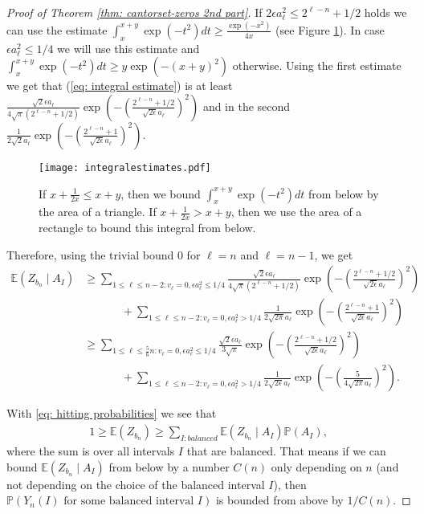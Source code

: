 \documentclass[11pt,reqno]{amsart}
\theoremstyle{plain}
\theoremstyle{definition}
\theoremstyle{remark}
\begin{document}
\begin{proof}[Proof of Theorem \ref{thm: cantorset-zeros 2nd part}]
If $2\epsilon a^2_\ell \leq 2^{\ell - n} + 1/2$ holds we can use the estimate $\int_x^{x+y} \exp(-t^2)dt \geq \frac{\exp{(-x^2)}}{4x}$ (see Figure \ref{fig: integral estimates}).
In case $\epsilon a^2_\ell \leq 1/4$ we will use this estimate and $\int_x^{x+y} \exp(-t^2)dt \geq y \exp (-(x+y)^2)$ otherwise. Using the first estimate we get that (\ref{eq: integral estimate}) is at least $\frac{\sqrt{2}\epsilon a_\ell}{4\sqrt{\pi}(2^{\ell - n}+1/2)}\exp(- (\frac{2^{\ell - n}+1/2}{\sqrt{2\epsilon}a_\ell})^2)$ and in the second $\frac{1}{2\sqrt{2}a_\ell}\exp(- (\frac{2^{\ell - n}+1}{\sqrt{2\epsilon}a_\ell})^2)$.

\begin{figure}

\texttt{[image: integralestimates.pdf]}

\caption{If $x+\frac{1}{2x} \leq x+y$, then we bound $\int_x^{x+y} \exp(-t^2)dt$ from below by the area of a triangle. If $x+\frac{1}{2x} > x+y$, then we use the area of a rectangle to bound this integral from below.}

\label{fig: integral estimates}

\end{figure}
Therefore, using the trivial bound $0$ for $\ell=n$ and $\ell=n-1$, we get
\begin{align}\label{eq: balanced first moment}
\mathbb{E} (Z_{b_n} \mid A_I) &\geq \sum_{1 \leq \ell \leq n-2: v_\ell=0, \epsilon a^2_\ell \leq 1/4} \frac{\sqrt{2}\epsilon a_\ell}{4\sqrt{\pi}(2^{\ell - n}+1/2)}\exp(- (\frac{2^{\ell - n}+1/2}{\sqrt{2\epsilon}a_\ell})^2) \\ \nonumber
& \ \ \ \ \  \ \ \ \ \  \ \ \ \ \ + \sum_{1 \leq \ell \leq n-2: v_\ell=0, \epsilon a^2_\ell > 1/4} \frac{1}{2\sqrt{2\pi}a_\ell}\exp(- (\frac{2^{\ell - n}+1}{\sqrt{2\epsilon}a_\ell})^2)
\\&\geq \sum_{1 \leq \ell \leq \frac{5}{6}n: v_\ell=0, \epsilon a^2_\ell \leq 1/4} \frac{\sqrt{2}\epsilon a_\ell}{3\sqrt{\pi}}\exp(- (\frac{2^{\ell - n}+1/2}{\sqrt{2\epsilon}a_\ell})^2) \nonumber
\\& \ \ \ \ \  \ \ \ \ \  \ \ \ \ \ + \sum_{1 \leq \ell \leq n-2: v_\ell=0, \epsilon a^2_\ell > 1/4} \frac{1}{2\sqrt{2\epsilon}a_\ell}\exp(- (\frac{5}{4\sqrt{2\pi}a_\ell})^2). \nonumber
\end{align}

With \eqref{eq: hitting probabilities} we see that
\begin{align}\label{eq: balanced first moment inequal}
1 \geq {\mathbb{E}} (Z_{b_n}) \geq\sum_{I: balanced} \mathbb{E} (Z_{b_n} \mid A_I) {\mathbb{P}}(A_I),
\end{align}
where the sum is over all intervals $I$ that are balanced.
That means if we can bound $\mathbb{E} (Z_{b_n} \mid A_I)$ from below by a number $C(n)$ only depending on $n$ (and not depending on the choice of the balanced interval $I$), then $\mathbb{P}(Y_n(I) \text{ for some balanced interval } I)$ is bounded from above by $1/C(n)$.


\end{proof}
\end{document}
